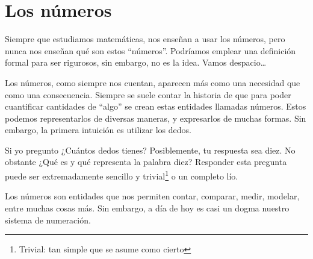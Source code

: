 \chapter{Los números}
Siempre que estudiamos matemáticas, nos enseñan a usar los números, pero nunca nos enseñan qué son estos ``números''. Podríamos emplear una definición formal para ser rigurosos, sin embargo, no es la idea. Vamos despacio\dots

Los números, como siempre nos cuentan, aparecen más como una necesidad que como una consecuencia. Siempre se suele contar la historia de que para poder cuantificar cantidades de ``algo'' se crean estas entidades llamadas números. Estos podemos representarlos de diversas maneras, y expresarlos de muchas formas. Sin embargo, la primera intuición es utilizar los dedos. 

Si yo pregunto ¿Cuántos dedos tienes? Posiblemente, tu respuesta sea diez. No obstante ¿Qué es y qué representa la palabra diez? Responder esta pregunta puede ser extremadamente sencillo y trivial\footnote{Trivial: tan simple que se asume como cierto} o un completo lío. 

Los números son entidades que nos permiten contar, comparar, medir, modelar, entre muchas cosas más. Sin embargo, a día de hoy es casi un dogma nuestro sistema de numeración. 














